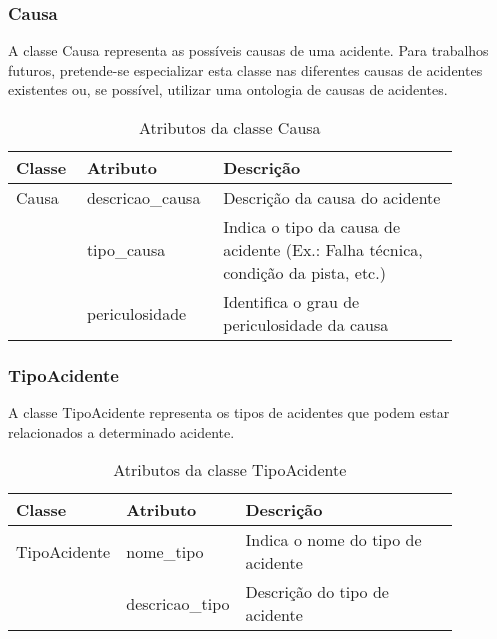 \subsubsection{\textbf{Causa}}

  A classe Causa representa as possíveis causas de uma acidente. Para trabalhos futuros, pretende-se especializar esta classe 
  nas diferentes causas de acidentes existentes ou, se possível, utilizar uma ontologia de causas de acidentes.
  
    \begin{table*}[!h]
    \centering
    \begin{tabular}{p{0.15\linewidth}p{0.23\linewidth}p{0.5\linewidth}}
      \hline
      \textbf{Classe} & \textbf{Atributo} & \textbf{Descrição}\\
      \hline
	Causa & descricao\_causa & Descrição da causa do acidente\\
	      & tipo\_causa & Indica o tipo da causa de acidente (Ex.: Falha técnica, condição da pista, etc.)\\
	      & periculosidade & Identifica o grau de periculosidade da causa\\
      \hline
    \end{tabular}
    \caption{Atributos da classe Causa}
    \label{tab:attr_causa}
    \end{table*}      
    
\subsubsection{\textbf{TipoAcidente}}

  A classe TipoAcidente representa os tipos de acidentes que podem estar relacionados a determinado acidente.
  
    \begin{table*}[!h]
    \centering
    \begin{tabular}{p{0.15\linewidth}p{0.23\linewidth}p{0.5\linewidth}}
      \hline
      \textbf{Classe} & \textbf{Atributo} & \textbf{Descrição}\\
      \hline
	TipoAcidente & nome\_tipo & Indica o nome do tipo de acidente\\
		     & descricao\_tipo & Descrição do tipo de acidente\\
      \hline
    \end{tabular}
    \caption{Atributos da classe TipoAcidente}
    \label{tab:attr_tipo_acidente}
    \end{table*}
    
